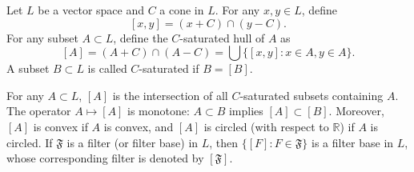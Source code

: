 Let $L$ be a vector space and $C$ a cone in $L$. For any $x, y \in L$, define
$$[x, y] = (x + C) \cap (y - C).$$
For any subset $A \subset L$, define the $C$-saturated hull of $A$ as
$$[A] = (A + C) \cap (A - C) = \bigcup \{[x, y] : x \in A, y \in A\}.$$
A subset $B \subset L$ is called $C$-saturated if $B = [B]$.

For any $A \subset L$, $[A]$ is the intersection of all $C$-saturated subsets containing $A$. The operator $A \mapsto [A]$ is monotone: $A \subset B$ implies $[A] \subset [B]$. Moreover, $[A]$ is convex if $A$ is convex, and $[A]$ is circled (with respect to $\mathbb{R}$) if $A$ is circled. If $\mathfrak{F}$ is a filter (or filter base) in $L$, then $\{[F] : F \in \mathfrak{F}\}$ is a filter base in $L$, whose corresponding filter is denoted by $[\mathfrak{F}]$.
